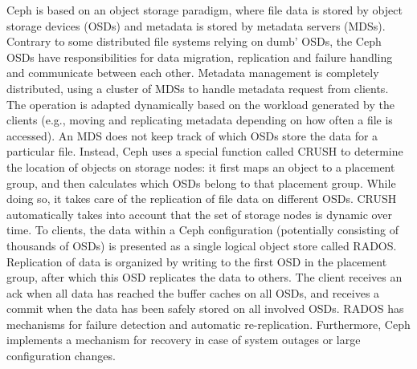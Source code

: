 \documentclass[11pt]{article}
\begin{document}
Ceph is based on an object storage paradigm, where file data is stored 
by object storage devices (OSDs) and metadata is stored by metadata 
servers (MDSs). Contrary to some distributed file systems relying on 
dumb’ OSDs, the Ceph OSDs have responsibilities for data migration, 
replication and failure handling and communicate between each other. 
Metadata management is completely distributed, using a cluster of MDSs 
to handle metadata request from clients. The operation is adapted 
dynamically based on the workload generated by the clients (e.g., moving 
and replicating metadata depending on how often a file is accessed).
An MDS does not keep track of which OSDs store the data for a particular 
file. Instead, Ceph uses a special function called CRUSH to determine the 
location of objects on storage nodes: it first maps an object to a 
placement group, and then calculates which OSDs belong to that placement 
group. While doing so, it takes care of the replication of file data on 
different OSDs. CRUSH automatically takes into account that the set of 
storage nodes is dynamic over time. To clients, the data within a Ceph 
configuration (potentially consisting of thousands of OSDs) is presented 
as a single logical object store called RADOS. Replication of data is 
organized by writing to the first OSD in the placement group, after which 
this OSD replicates the data to others. The client receives an ack when 
all data has reached the buffer caches on all OSDs, and receives a commit 
when the data has been safely stored on all involved OSDs. RADOS has 
mechanisms for failure detection and automatic re-replication. Furthermore, 
Ceph implements a mechanism for recovery in case of system outages or 
large configuration changes.
\end{document}
